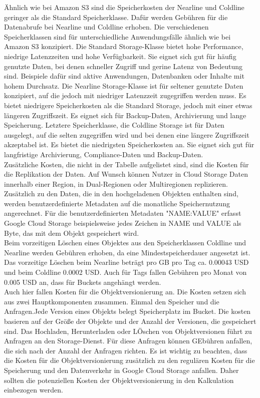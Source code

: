 Ähnlich wie bei Amazon S3 sind die Speicherkosten der Nearline und Coldline geringer als die Standard Speicherklasse. Dafür werden Gebühren für die Datenabrufe bei Nearline und Coldline erhoben. Die verschiedenen Speicherklassen sind für unterschiedliche Anwendungsfälle ähnlich wie bei Amazon S3 konzipiert. Die Standard Storage-Klasse bietet hohe Performance, niedrige Latenzzeiten und hohe Verfügbarkeit. Sie eignet sich gut für häufig genutzte Daten, bei denen schneller Zugriff und gerine Latenz von Bedeutung sind. Beispiele dafür sind aktive Anwendungen, Datenbanken oder Inhalte mit hohem Durchsatz. Die Nearline Storage-Klasse ist für seltener genutzte Daten konzipiert, auf die jedoch mit niedriger Latenzzeit zugegriffen werden muss. Es bietet niedrigere Speicherkosten als die Standard Storage, jedoch mit einer etwas längeren Zugriffszeit. Es eignet sich für Backup-Daten, Archivierung und lange Speicherung. Letztere Speicherklasse, die Coldline Storage ist für Daten ausgelegt, auf die selten zugegriffen wird und bei denen eine längere Zugriffszeit akzeptabel ist. Es bietet die niedrigsten Speicherkosten an. Sie eignet sich gut für langfristige Archivierung, Compliance-Daten und Backup-Daten.\\ 

Zusätzliche Kosten, die nicht in der Tabelle aufgelistet sind, sind die Kosten für die Replikation der Daten. Auf Wunsch können Nutzer in Cloud Storage Daten innerhalb einer Region, in Dual-Regionen oder Multiregionen replizieren. Zusätzlich zu den Daten, die in den hochgeladenen Objekten enthalten sind, werden benutzerdefinierte Metadaten auf die monatliche Speichernutzung angerechnet. Für die benutzerdefinierten Metadaten "NAME:VALUE" erfasst Google Cloud Storage beispielsweise jedes Zeichen in NAME und VALUE als Byte, das mit dem Objekt gespeichert wird.\\

Beim vorzeitigen Löschen eines Objektes aus den Speicherklassen Coldline und Nearline werden Gebühren erhoben, da eine Mindestspeicherdauer angesetzt ist. Das vorzeitige Löschen beim Nearline beträgt pro GB pro Tag ca. 0.00043 USD und beim Coldline 0.0002 USD. Auch für Tags fallen Gebühren pro Monat von 0.005 USD an, dass für Buckets angehängt werden.\\

Auch hier fallen Kosten für die Objektversionierung an. Die Kosten setzen sich aus zwei Hauptkomponenten zusammen. Einmal den Speicher und die Anfragen.Jede Version eines Objekts belegt Speicherplatz im Bucket. Die kosten basieren auf der Größe der Objekte und der Anzahl der Versionen, die gespeichert sind. Das Hochladen, Herunterladen oder LÖschen von Objektversionen führt zu Anfragen an den Storage-Dienst. Für diese Anfragen können GEbühren anfallen, die sich nach der Anzahl der Anfragen richten. Es ist wichtig zu beachten, dass die Kosten für die Objektversionierung zusätzlich zu den regulären Kosten für die Speicherung und den Datenverkehr in Google Cloud Storage anfallen. Daher sollten die potenziellen Kosten der Objektversionierung in den Kalkulation einbezogen werden.

